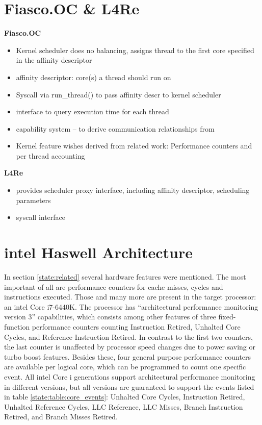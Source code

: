 \section{Fiasco.OC \& L4Re}
\label{state:env}

\textbf{Fiasco.OC}
\begin{itemize}
  \item Kernel scheduler does no balancing, assigns thread to the first
    core specified in the affinity descriptor
  \item affinity descriptor: core(s) a thread should run on
  \item Syscall via run\_thread() to pass affinity descr to kernel scheduler
  \item interface to query execution time for each thread
  \item capability system -- to derive communication relationships from
  \item	Kernel feature wishes derived from related work: Performance counters
    and per thread accounting
\end{itemize}

\textbf{L4Re}
\begin{itemize}
  \item provides scheduler proxy interface, including affinity descriptor,
    scheduling parameters
  \item syscall interface
\end{itemize}



\section{\gls{intel} Haswell Architecture}
\label{state:haswell}

In section \ref{state:related} several hardware features were mentioned.
The most important of all are performance counters for cache misses, cycles and
instructions executed.
Those and many more are present in the target processor: an \gls{intel} Core
i7-6440K.
The processor has ``architectural performance monitoring version 3''
capabilities, which consists among other features of three fixed-function
performance counters counting Instruction Retired, Unhalted Core Cycles, and
Reference Instruction Retired.
In contrast to the first two counters, the last counter is unaffected by
processor speed changes due to power saving or turbo boost features.
Besides these, four general purpose performance counters are available per
logical core, which can be programmed to count one specific event.
All \gls{intel} Core i generations support architectural performance monitoring
in different versions, but all versions are guaranteed to support the events
listed in table \ref{state:table:core_events}: Unhalted Core Cycles,
Instruction Retired, Unhalted Reference Cycles, LLC Reference, LLC Misses,
Branch Instruction Retired, and Branch Misses Retired.

